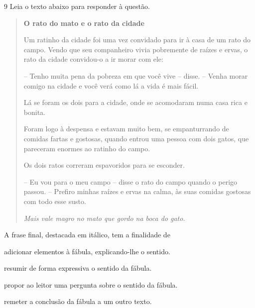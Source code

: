 \num{9} Leia o texto abaixo para responder à questão. 

\begin{quote}

\textbf{O rato do mato e o rato da cidade}

Um ratinho da cidade foi uma vez convidado para ir à casa
de um rato do campo. Vendo que seu companheiro vivia pobremente de
raízes e ervas, o rato da cidade convidou-o a ir morar com ele:

-- Tenho muita pena da pobreza em que você vive --
disse. -- Venha morar comigo na cidade e você verá como lá a
vida é mais fácil.

Lá se foram os dois para a cidade, onde se acomodaram
numa casa rica e bonita.

Foram logo à despensa e estavam muito bem, se
empanturrando de comidas fartas e gostosas, quando entrou uma
pessoa com dois gatos, que pareceram enormes ao ratinho do
campo.

Os dois ratos correram espavoridos para se esconder.

-- Eu vou para o meu campo -- disse o rato do campo
quando o perigo passou. -- Prefiro minhas raízes e ervas na
calma, às suas comidas gostosas com todo esse susto.

\textit{Mais vale magro no mato que gordo na boca do gato.} 

\end{quote}


A frase final, destacada em itálico, tem a finalidade de 

\begin{escolha}
    
    \item adicionar elementos à fábula, explicando-lhe o sentido. 
    
    \item resumir de forma expressiva o sentido da fábula. 
    
    \item propor ao leitor uma pergunta sobre o sentido da fábula.
    
    \item remeter a conclusão da fábula a um outro texto.  

\end{escolha}

